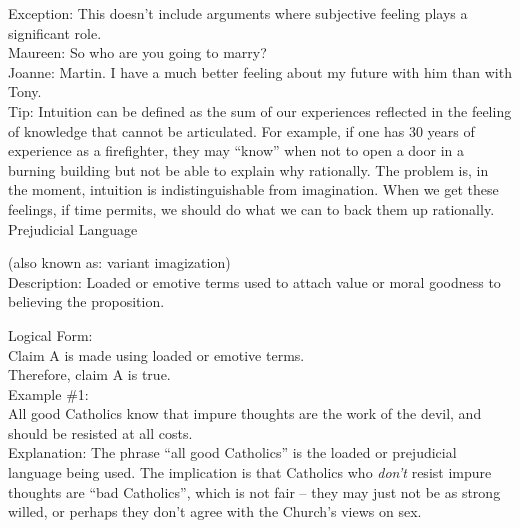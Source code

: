 \documentclass[a4paper,12pt,single,pdftex]{scrartcl}
\begin{document}
    
      Exception: This doesn't include arguments where subjective feeling plays a significant role.
    \\

    
      Maureen: So who are you going to marry?
    \\

    
      Joanne: Martin. I have a much better feeling about my future with him than with Tony.
    \\

    
      Tip: Intuition can be defined as the sum of our experiences reflected in the feeling of knowledge that cannot be articulated. For example, if one has 30 years of experience as a firefighter, they may “know” when not to open a door in a burning building but not be able to explain why rationally. The problem is, in the moment, intuition is indistinguishable from imagination. When we get these feelings, if time permits, we should do what we can to back them up rationally.
    \\

  

Prejudicial Language
    
      (also known as: variant imagization)
    \\

  
    Description: Loaded or emotive terms used to attach value or moral goodness to believing the proposition.

    
      Logical Form:
    \\

    
      Claim A is made using loaded or emotive terms.
    \\

    
      Therefore, claim A is true.
    \\

    
      Example \#1:
    \\

    
      All good Catholics know that impure thoughts are the work of the devil, and should be resisted at all costs.
    \\

    
      Explanation: The phrase “all good Catholics” is the loaded or prejudicial language being used.  The implication is that Catholics who {\it don’t}  resist impure thoughts are “bad Catholics”, which is not fair -- they may just not be as strong willed, or perhaps they don’t agree with the Church's views on sex.
    \\
\end{document}
